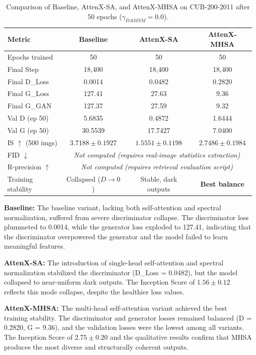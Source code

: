 \documentclass[conference]{IEEEtran}
\begin{document}
\begin{table}[t]
\centering
\caption{Comparison of Baseline, AttenX-SA, and AttenX-MHSA on CUB-200-2011 after 50 epochs ($\gamma_{DAMSM}=0.0$).}
\label{tab:quantitative_results}
\begin{tabular}{lccc}
\toprule
\textbf{Metric} & \textbf{Baseline} & \textbf{AttenX-SA} & \textbf{AttenX-MHSA} \\
\midrule
Epochs trained & 50 & 50 & 50 \\
Final Step & 18,400 & 18,400 & 18,400 \\
Final D\_Loss & 0.0014 & 0.0482 & 0.2820 \\
Final G\_Loss & 127.41 & 27.63 & 9.36 \\
Final G\_GAN & 127.37 & 27.59 & 9.32 \\
Val D (ep 50) & 5.6835 & 0.4872 & 1.6444 \\
Val G (ep 50) & 30.5539 & 17.7427 & 7.0400 \\
IS $\uparrow$ (500 imgs) & $3.7188 \pm 0.1927$ & $1.5551 \pm 0.1198$ & $2.7486 \pm 0.1984$ \\
FID $\downarrow$ & \multicolumn{3}{c}{\textit{Not computed (requires real-image statistics extraction)}} \\
R-precision $\uparrow$ & \multicolumn{3}{c}{\textit{Not computed (requires retrieval evaluation script)}} \\
\midrule
Training stability & Collapsed ($D \rightarrow 0$) & Stable, dark outputs & \textbf{Best balance} \\
\bottomrule
\end{tabular}
\end{table}

\textbf{Baseline:} The baseline variant, lacking both self-attention and spectral normalization, suffered from severe discriminator collapse. The discriminator loss plummeted to 0.0014, while the generator loss exploded to 127.41, indicating that the discriminator overpowered the generator and the model failed to learn meaningful features.

\textbf{AttenX-SA:} The introduction of single-head self-attention and spectral normalization stabilized the discriminator (D\_Loss = 0.0482), but the model collapsed to near-uniform dark outputs. The Inception Score of $1.56 \pm 0.12$ reflects this mode collapse, despite the healthier loss values.

\textbf{AttenX-MHSA:} The multi-head self-attention variant achieved the best training stability. The discriminator and generator losses remained balanced (D = 0.2820, G = 9.36), and the validation losses were the lowest among all variants. The Inception Score of $2.75 \pm 0.20$ and the qualitative results confirm that MHSA produces the most diverse and structurally coherent outputs.
\end{document}
